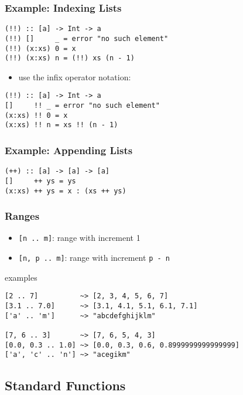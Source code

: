 \documentclass[dvipsnames]{beamer}
\theoremstyle{plain}
\begin{document}
\begin{frame}[fragile]
  \frametitle{Example: Indexing Lists}

  \begin{lstlisting}
(!!) :: [a] -> Int -> a
(!!) []     _ = error "no such element"
(!!) (x:xs) 0 = x
(!!) (x:xs) n = (!!) xs (n - 1)
  \end{lstlisting}

  \pause
  \begin{itemize}
    \item use the infix operator notation:
  \end{itemize}

  \begin{lstlisting}
(!!) :: [a] -> Int -> a
[]     !! _ = error "no such element"
(x:xs) !! 0 = x
(x:xs) !! n = xs !! (n - 1)
  \end{lstlisting}
\end{frame}

\begin{frame}[fragile]
  \frametitle{Example: Appending Lists}

  \begin{lstlisting}
(++) :: [a] -> [a] -> [a]
[]     ++ ys = ys
(x:xs) ++ ys = x : (xs ++ ys)
  \end{lstlisting}
\end{frame}

\begin{frame}[fragile]
  \frametitle{Ranges}

  \begin{itemize}
    \item \lstinline|[n .. m]|: range with increment 1
    \item \lstinline|[n, p .. m]|: range with increment \texttt{p - n}
  \end{itemize}

  \begin{exampleblock}{examples}
    \begin{lstlisting}
[2 .. 7]          ~> [2, 3, 4, 5, 6, 7]
[3.1 .. 7.0]      ~> [3.1, 4.1, 5.1, 6.1, 7.1]
['a' .. 'm']      ~> "abcdefghijklm"

[7, 6 .. 3]       ~> [7, 6, 5, 4, 3]
[0.0, 0.3 .. 1.0] ~> [0.0, 0.3, 0.6, 0.8999999999999999]
['a', 'c' .. 'n'] ~> "acegikm"
    \end{lstlisting}
  \end{exampleblock}
\end{frame}

\subsection{Standard Functions}
\end{document}
